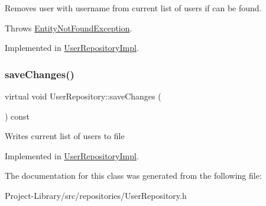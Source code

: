 Removes user with username from current list of users if can be found.

Throws \hyperlink{structEntityNotFoundException}{Entity\+Not\+Found\+Exception}. 

Implemented in \hyperlink{classUserRepositoryImpl_a378218667dea52fcd31a345547b9e7cf}{User\+Repository\+Impl}.

\mbox{\label{classUserRepository_a282496e98e0cc0d377531575047adeab}} 
\subsubsection{\texorpdfstring{save\+Changes()}{saveChanges()}}
{\footnotesize\ttfamily virtual void User\+Repository\+::save\+Changes (\begin{DoxyParamCaption}{ }\end{DoxyParamCaption}) const\hspace{0.3cm}{\ttfamily [pure virtual]}}

Writes current list of users to file 

Implemented in \hyperlink{classUserRepositoryImpl_a9a4406e613a882f4f71b9325781264a5}{User\+Repository\+Impl}.



The documentation for this class was generated from the following file\+:\begin{DoxyCompactItemize}
\item 
Project-\/\+Library/src/repositories/User\+Repository.\+h\end{DoxyCompactItemize}
